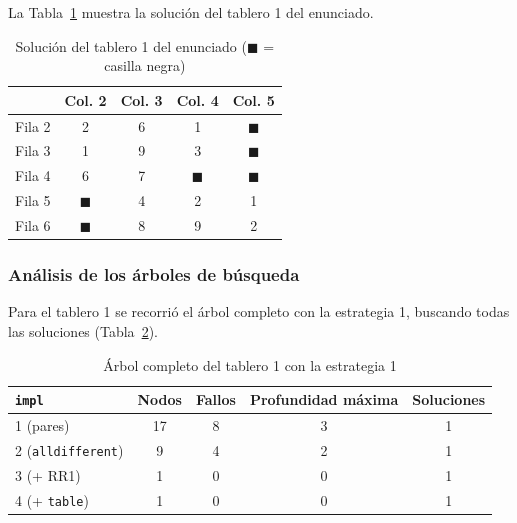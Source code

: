 La Tabla~\ref{tab:kakuro-solucion} muestra la solución del tablero 1 del enunciado.

\begin{table}[htbp]
    \caption{Solución del tablero 1 del enunciado ($\blacksquare$ = casilla negra)}
    \label{tab:kakuro-solucion}
    \begin{tabular}{@{}lcccc@{}}
        \toprule
                & Col. 2         & Col. 3 & Col. 4         & Col. 5         \\
        \midrule
        Fila 2 & 2              & 6      & 1              & $\blacksquare$ \\
        Fila 3 & 1              & 9      & 3              & $\blacksquare$ \\
        Fila 4 & 6              & 7      & $\blacksquare$ & $\blacksquare$ \\
        Fila 5 & $\blacksquare$ & 4      & 2              & 1              \\
        Fila 6 & $\blacksquare$ & 8      & 9              & 2              \\
        \bottomrule
    \end{tabular}
\end{table}

\subsubsection{Análisis de los árboles de búsqueda}

Para el tablero 1 se recorrió el árbol completo con la estrategia 1, buscando todas las soluciones (Tabla~\ref{tab:kakuro-arbol}).

\begin{table}[htbp]
    \caption{Árbol completo del tablero 1 con la estrategia 1}
    \label{tab:kakuro-arbol}
    \begin{tabular}{@{}lcccc@{}}
        \toprule
        \texttt{impl}                & Nodos & Fallos & Profundidad máxima & Soluciones \\
        \midrule
        1 (pares)                    & 17    & 8      & 3                  & 1          \\
        2 (\texttt{alldifferent})    & 9     & 4      & 2                  & 1          \\
        3 (+ RR1)                    & 1     & 0      & 0                  & 1          \\
        4 (+ \texttt{table})         & 1     & 0      & 0                  & 1          \\
        \bottomrule
    \end{tabular}
\end{table}

